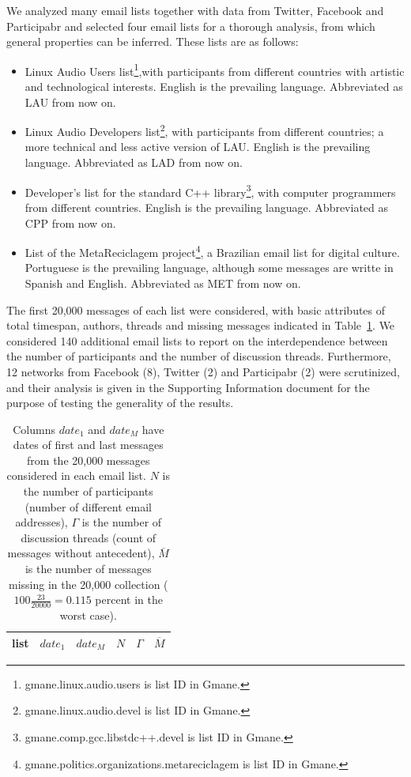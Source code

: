 \documentclass[%
	aip,
	jmp,%
	amsmath,amssymb,
	reprint,%
]{revtex4-1}
\begin{document}
We analyzed many email lists together with data from Twitter, Facebook and Participabr and selected four email lists for a thorough analysis,
from which general properties can be inferred. These lists are as follows:

\begin{itemize}
	\item Linux Audio Users list\footnote{gmane.linux.audio.users is list ID in Gmane.},with participants from different countries with artistic and technological interests. English is the prevailing language. Abbreviated as LAU from now on.

	\item Linux Audio Developers list\footnote{gmane.linux.audio.devel is list ID in Gmane.}, with participants from different countries; a more technical and less active version of LAU. English is the prevailing language. Abbreviated as LAD from now on.

	\item Developer's list for the standard C++ library\footnote{gmane.comp.gcc.libstdc++.devel is list ID in Gmane.}, with computer programmers from different countries. English is the prevailing language. Abbreviated as CPP from now on.
	\item List of the MetaReciclagem project\footnote{gmane.politics.organizations.metareciclagem is list ID in Gmane.}, a Brazilian email list for digital culture. 	Portuguese is the prevailing language, although some messages are writte in Spanish and English. Abbreviated as MET from now on.
\end{itemize} 

The first 20,000 messages of each list were considered, with basic attributes of total timespan, authors, threads and missing messages indicated in Table~\ref{tab:genLists}. We considered 140 additional email lists to report on the interdependence between the number of participants and the number of discussion threads. Furthermore, 12 networks from Facebook (8), Twitter (2) and Participabr (2) were scrutinized, and their analysis is given in the Supporting Information document for the purpose of testing the generality of the results.

\begin{table}
	\centering
	\caption{Columns $date_1$ and $date_M$ have dates of first and last messages from the 20,000 messages considered in each email list.
		$N$ is the number of participants (number of different email addresses),
		$\Gamma$ is the number of discussion threads (count of messages without antecedent),
		$\overline{M}$ is the number of messages missing in the 20,000 collection
		($100\frac{23}{20000}=0.115$ percent in the worst case).
	}
	\label{tab:genLists}
	\begin{tabular}{|l|c|c|c|c|c|}\hline
		list & $date_1$ & $date_{M}$    & $N$  & $\Gamma$ & $\overline{M}$ \\\hline
		
	\end{tabular}
\end{table}
\end{document}
